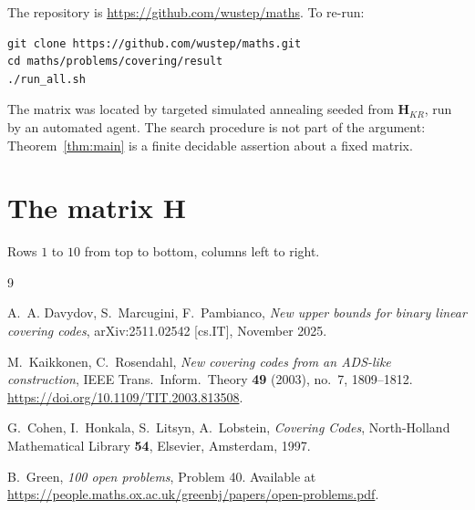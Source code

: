 \documentclass[11pt,a4paper]{article}
\theoremstyle{definition}
\theoremstyle{remark}
\newcommand{\HH}{\boldsymbol{H}}
\begin{document}
The repository is \url{https://github.com/wustep/maths}. To re-run:

\begin{verbatim}
git clone https://github.com/wustep/maths.git
cd maths/problems/covering/result
./run_all.sh
\end{verbatim}

The matrix was located by targeted simulated annealing seeded from
$\HH_{KR}$, run by an automated agent. The search procedure is not part of the
argument: Theorem~\ref{thm:main} is a finite decidable assertion about a fixed
matrix.

\appendix

\section{The matrix $\HH$}\label{app:H}

Rows $1$ to $10$ from top to bottom, columns left to right.



\begin{thebibliography}{9}

A.~A. Davydov, S.~Marcugini, F.~Pambianco,
\emph{New upper bounds for binary linear covering codes},
arXiv:2511.02542 [cs.IT], November 2025.

M.~Kaikkonen, C.~Rosendahl,
\emph{New covering codes from an ADS-like construction},
IEEE Trans.\ Inform.\ Theory \textbf{49} (2003), no.~7, 1809--1812.
\url{https://doi.org/10.1109/TIT.2003.813508}.

G.~Cohen, I.~Honkala, S.~Litsyn, A.~Lobstein,
\emph{Covering Codes}, North-Holland Mathematical Library \textbf{54},
Elsevier, Amsterdam, 1997.

B.~Green, \emph{100 open problems}, Problem 40.
Available at \url{https://people.maths.ox.ac.uk/greenbj/papers/open-problems.pdf}.

\end{thebibliography}
\end{document}
